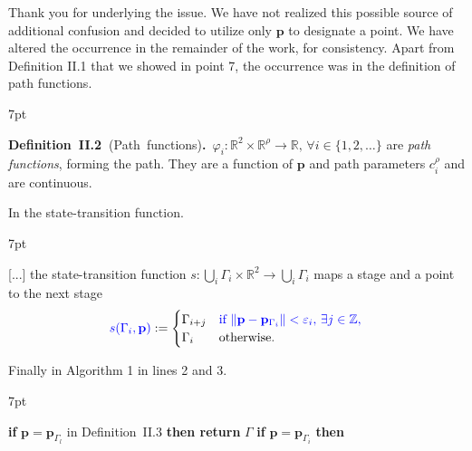 \documentclass[10pt]{letter}
\newenvironment{formal}{%
  \def\FrameCommand{%
    \hspace{1pt}%
    {\color{red}\vrule width 2pt}%
    {\color{formalshade}\vrule width 4pt}%
    \colorbox{formalshade}%
  }%
  \MakeFramed{\advance\hsize-\width\FrameRestore}%
  \noindent\hspace{-4.55pt}%
  \begin{adjustwidth}{}{7pt}%
  \vspace{2pt}\vspace{2pt}%
}
{%
  \vspace{2pt}\end{adjustwidth}\endMakeFramed%
}
\DeclarePairedDelimiter\norm{\lVert}{\rVert}%
\begin{document}
{\color{blue} 

{\hspace*{-4.5em}{[R1:10]}\vspace*{-1.9em}}

Thank you for underlying the issue. We have not realized this possible source of additional confusion and decided to utilize only $\mathbf{p}$ to designate a point. We have altered the occurrence in the remainder of the work, for consistency. Apart from Definition II.1 that we showed in point 7, the occurrence was in the definition of path functions.

\begin{formal}
  \color{black}
  \textbf{Definition~II.2~}(Path~functions)\textbf{.}~$\varphi_i:\mathbb{R}^2\times\mathbb{R}^\rho\rightarrow\mathbb{R},\,\forall i\in\{1,2,\dots\}
  $ are \emph{path functions}, forming the path. They are a function of {\color{blue}$\mathbf{p}%
  $} and path parameters $c_i^\rho%
  $ and are continuous.
  \vspace*{1ex}
\end{formal}

In the state-transition function.

\begin{formal}
  \color{black}
  [...] the state-transition function $s:\bigcup_i{\Gamma_i}\times\mathbb{R}^2\rightarrow\bigcup_i{\Gamma_i}$ maps a stage and a point to the next stage
  \begin{equation*}{\color{blue}s(\Gamma_i,\mathbf{p}%
    )}:=\begin{cases}
    \Gamma_{i+j} & {\color{blue}\text{if }\norm{\mathbf{p}%
    -\mathbf{p}_{\Gamma_i}}<\varepsilon_i,\,\exists j\in\mathbb{Z},}\\
    \Gamma_i & \text{otherwise}.
  \end{cases}\end{equation*}
\end{formal}

Finally in Algorithm 1 in lines 2 and 3.

\begin{formal}
  \begin{algorithmic}[1]
    \small
      \makeatletter
      \setcounter{ALC@line}{1}
      \makeatother
      \STATE \textbf{if} $\mathbf{p}%
      =\mathbf{p}_{\Gamma_l}${ in Definition~{\color{red}II.3}} \textbf{then return }$\Gamma$\vspace*{.3ex}
      \vspace*{.8ex}
      \STATE \textbf{if} $\mathbf{p}%
      =\mathbf{p}_{\Gamma_i}$ \textbf{then}
    \end{algorithmic}
  \end{formal}  

}
\end{document}
